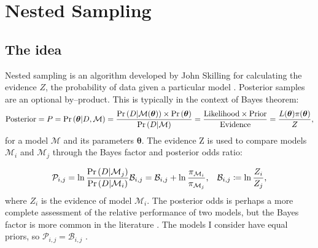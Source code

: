 \documentclass{article}
\begin{document}
\section{Nested Sampling}
\subsection{The idea}
Nested sampling is an algorithm developed by John Skilling for calculating the evidence $Z$, the probability of data given a particular model \cite{skilling} \cite{Ashton_2022}. Posterior samples are an optional by--product. This is typically in the context of Bayes theorem:
\begin{equation}
  \textrm{Posterior} = P = \Pr\left(\bm{\theta}| D, \mathcal{M}\right) = \frac{\Pr\left(D|\mathcal{M}(\bm\theta)\right) \times \Pr\left(\bm\theta\right)}{\Pr\left(D|\mathcal{M}\right)} = \frac{\textrm{Likelihood} \times \textrm{Prior}}{\textrm{Evidence}} = \frac{L(\bm\theta) \pi(\bm{\theta})}{Z}\textrm,
  \label{bayes}
\end{equation}
%
for a model $\mathcal{M}$ and its parameters $\bm{\theta}$. The evidence Z is used to compare models $\mathcal{M}_i$ and $\mathcal{M}_j$ through the Bayes factor and posterior odds ratio:

\begin{equation}
  \mathcal{P}_{i, j} = \ln\frac{\Pr\left(D|\mathcal{M}_j\right)}{\Pr\left(D|\mathcal{M}_i\right)}
  \mathcal{B}_{i, j} = \mathcal{B}_{i, j} + \ln\frac{\pi_{\mathcal{M}_i}}{\pi_{\mathcal{M}_j}} \textrm, \quad \mathcal B_{i, j} \coloneqq \ln\frac{Z_i}{Z_j} \textrm,
\end{equation}
%
where $Z_i$ is the evidence of model $\mathcal M_i$. The posterior odds is perhaps a more complete assessment of the relative performance of two models, but the Bayes factor is more common in the literature \cite{Sonke}. The models I consider have equal priors, so $\mathcal{P}_{i,j} = \mathcal{B}_{i,j}$ \cite{Sonke}.
\end{document}
